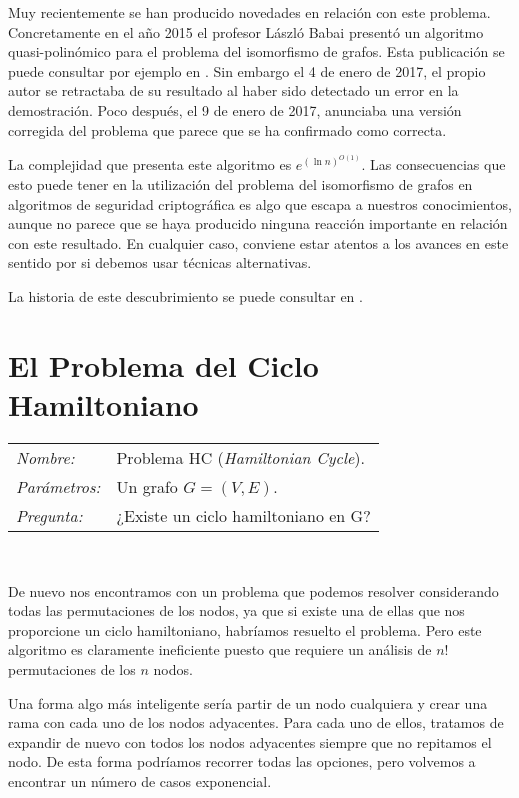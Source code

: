Muy recientemente se han producido novedades en relaci\'on con este problema. Concretamente
en el a\~no 2015 el profesor László Babai present\'o un algoritmo quasi-polin\'omico para
el problema del isomorfismo de grafos. Esta publicaci\'on se puede consultar por ejemplo en \cite{babai}.
Sin embargo el 4 de enero de 2017, el propio autor se retractaba de su resultado al haber sido
detectado un error en la demostraci\'on. Poco despu\'es, el 9 de enero de 2017, anunciaba una versi\'on
corregida del problema que parece que se ha confirmado como correcta.

La complejidad que presenta este algoritmo es $e^{(\ln n)^{O(1)}}$. Las consecuencias que esto puede
tener en la utilizaci\'on del problema del isomorfismo de grafos en algoritmos de seguridad criptogr\'afica
es algo que escapa a nuestros conocimientos, aunque no parece que se haya producido ninguna reacci\'on
importante en relaci\'on con este resultado. En cualquier caso, conviene estar atentos a los avances
en este sentido por si debemos usar t\'ecnicas alternativas.

La historia de este descubrimiento se puede consultar en \citep{isomorfismoResuelto}.

\hfil

\section{El Problema del Ciclo Hamiltoniano}

\hfil

\begin{tabular}{|ll}\label{problemaHC}\index{Problema Ciclo Hamiltoniano}\index{HC}
	\textit{Nombre:} & Problema HC ({\em Hamiltonian Cycle}). \\
	\textit{Parámetros:} & Un grafo $G=(V,E)$. \\
	\textit{Pregunta:} & ¿Existe un ciclo hamiltoniano en G? \\
\end{tabular}
\\

\hfil

De nuevo nos encontramos con un problema que podemos resolver considerando todas
las permutaciones de los nodos, ya que si existe una de ellas que nos proporcione
un ciclo hamiltoniano, habr\'iamos resuelto el problema. Pero este algoritmo es
claramente ineficiente puesto que requiere un an\'alisis de $n!$ permutaciones de los
$n$ nodos.

Una forma algo m\'as inteligente ser\'ia partir de un nodo cualquiera y crear una rama con cada uno de los nodos
adyacentes. Para cada uno de ellos, tratamos de expandir de nuevo con todos los nodos adyacentes siempre que
no repitamos el nodo. De esta forma podr\'iamos recorrer todas las opciones, pero volvemos a
encontrar un n\'umero de casos exponencial.

